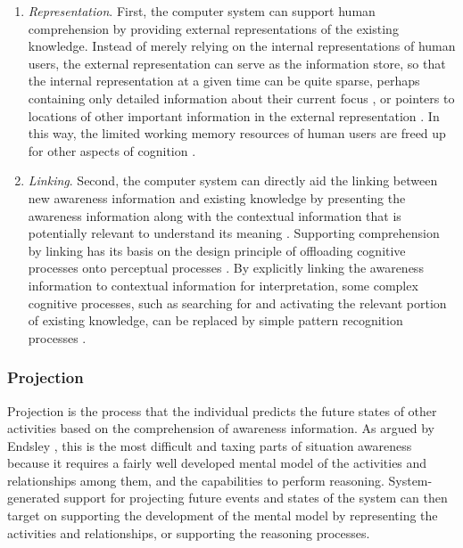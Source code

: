 \begin{enumerate}
	\item \emph{Representation}. First, the computer system can support human comprehension by providing external representations of the existing knowledge. Instead of merely relying on the internal representations of human users, the external representation can serve as the information store, so that the internal representation at a given time can be quite sparse, perhaps containing only detailed information about their current focus \cite{Hegarty2011}, or pointers to locations of other important information in the external representation \cite{M.1996}. In this way, the limited working memory resources of human users are freed up for other aspects of cognition \cite{M.1996}.
	\item \emph{Linking}. Second, the computer system can directly aid the linking between new awareness information and existing knowledge by presenting the awareness information along with the contextual information that is potentially relevant to understand its meaning \cite{Tomaszewski2010}. Supporting comprehension by linking has its basis on the design principle of offloading cognitive processes onto perceptual processes \cite{M.1996}. By explicitly linking the awareness information to contextual information for interpretation, some complex cognitive processes, such as searching for and activating the relevant portion of existing knowledge, can be replaced by simple pattern recognition processes \cite{Hegarty2011}. 
\end{enumerate}

\subsubsection*{Projection} %
\label{ssub:projection}
Projection is the process that the individual predicts the future states of other activities based on the comprehension of awareness information. As argued by Endsley \cite{Endsley1995}, this is the most difficult and taxing parts of situation awareness because it requires a fairly well developed mental model of the activities and relationships among them, and the capabilities to perform reasoning. System-generated support for projecting future events and states of the system can then target on supporting the development of the mental model by representing the activities and relationships, or supporting the reasoning processes. 

